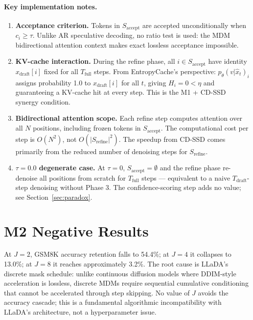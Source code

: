 \documentclass{article}
\newcommand{\Saccept}{S_{\text{accept}}}
\newcommand{\Srefine}{S_{\text{refine}}}
\newcommand{\Tdraft}{T_{\text{draft}}}
\newcommand{\Tfull}{T_{\text{full}}}
\newcommand{\xdraft}{x_{\text{draft}}}
\begin{document}
\paragraph{Key implementation notes.}
\begin{enumerate}
\item \textbf{Acceptance criterion.} Tokens in $\Saccept$ are accepted unconditionally when $c_i \geq \tau$.
  Unlike AR speculative decoding, no ratio test is used: the MDM bidirectional attention context makes
  exact lossless acceptance impossible.

\item \textbf{KV-cache interaction.} During the refine phase, all $i \in \Saccept$ have identity
  $\xdraft[i]$ fixed for all $\Tfull$ steps. From EntropyCache's perspective: $p_\theta(v |
  \hat{x}_t)_i$ assigns probability 1.0 to $\xdraft[i]$ for all $t$, giving $H_i = 0 < \eta$ and
  guaranteeing a KV-cache hit at every step. This is the M1 + CD-SSD synergy condition.

\item \textbf{Bidirectional attention scope.} Each refine step computes attention over all $N$
  positions, including frozen tokens in $\Saccept$. The computational cost per step is $O(N^2)$,
  not $O(|\Srefine|^2)$. The speedup from CD-SSD comes primarily from the reduced number of
  denoising steps for $\Srefine$.

\item \textbf{$\tau = 0.0$ degenerate case.} At $\tau = 0$, $\Saccept = \emptyset$ and the refine
  phase re-denoise all positions from scratch for $\Tfull$ steps --- equivalent to a naive
  $\Tdraft$-step denoising without Phase 3. The confidence-scoring step adds no value; see
  Section~\ref{sec:paradox}.
\end{enumerate}

\section{M2 Negative Results}
\label{appendix:m2}

At $J = 2$, GSM8K accuracy retention falls to 54.4\%; at $J = 4$ it collapses to 13.0\%; at
$J = 8$ it reaches approximately 3.2\%. The root cause is LLaDA's discrete mask schedule: unlike
continuous diffusion models where DDIM-style acceleration is lossless, discrete MDMs require
sequential cumulative conditioning that cannot be accelerated through step skipping. No value of $J$
avoids the accuracy cascade; this is a fundamental algorithmic incompatibility with LLaDA's
architecture, not a hyperparameter issue.
\end{document}
